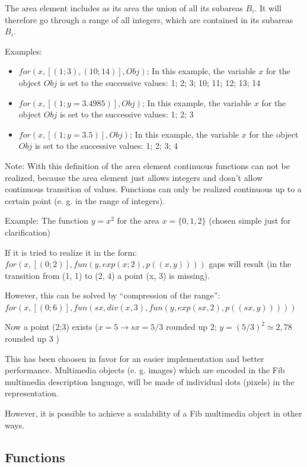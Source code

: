 The area element includes as its area the union of all its subareas $ B_{i}$. It will therefore go through a range of all integers, which are contained in its subareas $ B_{i} $.

\bigskip\noindent
Examples:
\begin{itemize}
 \item $for(x,[(1;3),(10;14)],Obj)$; In this example, the variable $x$ for the object $Obj$ is set to the successive values: 1; 2; 3; 10; 11; 12; 13; 14
 \item $for(x,[(1;y=3.4985)],Obj)$; In this example, the variable $x$ for the object $Obj$ is set to the successive values: 1; 2; 3
 \item $for(x,[(1;y=3.5)],Obj)$; In this example, the variable $x$ for the object $Obj$ is set to the successive values: 1; 2; 3; 4
\end{itemize}


\bigskip\noindent
Note:
With this definition of the area element continuous functions can not be realized, because the area element just allows integers and dosn't allow continuous transition of values. Functions can only be realized continuous up to a certain point (e. g. in the range of integers).

\bigskip\noindent
Example:
The function $y = x^{2}$ for the area $x = \{0, 1, 2\}$ (chosen simple just for clarification)

If it is tried to realize it in the form:
$for(x,[(0;2)], fun(y,exp(x;2), p((x,y))))$
gaps will result (in the transition from (1, 1) to (2, 4) a point (x, 3) is missing).

However, this can be solved by ``compression of the range'':\\
$for(x,[(0;6)], fun(sx, div(x,3), fun(y,exp(sx,2), p((sx,y)))))$

Now a point (2;3) exists ($x = 5 \rightarrow sx = 5/3$ rounded up $2$; $y = (5/3)^2 \simeq 2,78$ rounded up $3$ )

\bigskip\noindent
This has been choosen in favor for an easier implementation and better performance.
Multimedia objects (e. g. images) which are encoded in the Fib multimedia description language, will be made of individual dots (pixels) in the representation.

However, it is possible to achieve a scalability of a Fib multimedia object in other ways. %



\subsection{Functions}
\label{fibFunction}\label{secFibFunction}

